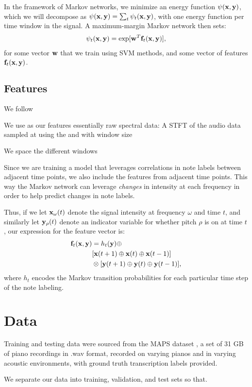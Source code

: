 \documentclass{article}
\begin{document}
In the framework of Markov networks, we minimize
an energy function $\psi(\mathbf{x},\mathbf{y})$, which we will decompose as
$\psi(\mathbf{x},\mathbf{y}) = \sum_t \psi_t(\mathbf{x},\mathbf{y})$, with one energy function per time window
in the signal. A maximum-margin Markov network then sets:
\[ \psi_t(\mathbf{x},\mathbf{y}) = \exp[\mathbf{w}^T\mathbf{f}_t(\mathbf{x},\mathbf{y})], \]
for some vector $\mathbf{w}$ that we train using SVM methods, and some vector of
features $\mathbf{f}_t(\mathbf{x},\mathbf{y})$.

\subsection{Features}
We follow \cite{} 


We use as our features essentially raw spectral data:
A STFT of the audio data sampled at %
using the %
and with window size %

We space the different windows %

Since we are training a model that leverages correlations in note labels
between adjacent time points, we also include the features from adjacent
time points. This way the Markov network can leverage \emph{changes} in
intensity at each frequency in order to help predict changes in note labels.

Thus, if we let $\mathbf{x}_{\omega}(t)$ denote the signal intensity at frequency
$\omega$ and time $t$, and similarly let $\mathbf{y}_{\rho}(t)$ denote an indicator
variable for whether pitch $\rho$ is on at time $t$, our expression for the
feature vector is:
\begin{align*}
  \mathbf{f}_t(\mathbf{x},\mathbf{y}) &= h_t(\mathbf{y}) \oplus
      \\& [\mathbf{x}(t+1) \oplus \mathbf{x}(t) \oplus \mathbf{x}(t-1)]
      \\&\otimes [\mathbf{y}(t+1) \oplus \mathbf{y}(t) \oplus \mathbf{y}(t-1)],
\end{align*}
where $h_t$ encodes the Markov transition probabilities for each particular
time step of the note labeling.

\section{Data}
Training and testing data were sourced from the MAPS dataset 
\cite{emiya2010multipitch}, a set of 31 GB of piano recordings in .wav format,
recorded on varying pianos and in varying acoustic environments, with ground
truth transcription labels provided.

We separate our data into training, validation, and test sets so that.
\end{document}
